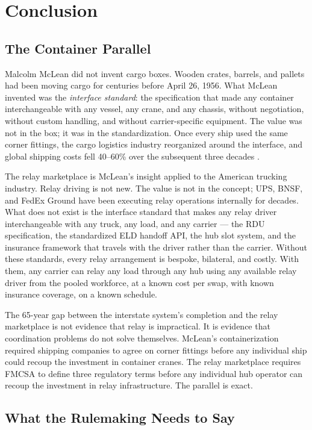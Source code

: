 \section{Conclusion}
\label{sec:conclusion}

\subsection{The Container Parallel}

Malcolm McLean did not invent cargo boxes. Wooden crates, barrels, and pallets had been moving
cargo for centuries before April 26, 1956. What McLean invented was the \textit{interface
standard}: the specification that made any container interchangeable with any vessel, any crane,
and any chassis, without negotiation, without custom handling, and without carrier-specific
equipment. The value was not in the box; it was in the standardization. Once every ship used
the same corner fittings, the cargo logistics industry reorganized around the interface, and
global shipping costs fell 40--60\% over the subsequent three decades \citep{Levinson2006}.

The relay marketplace is McLean's insight applied to the American trucking industry. Relay
driving is not new. The value is not in the concept; UPS, BNSF, and FedEx Ground have been
executing relay operations internally for decades. What does not exist is the interface standard
that makes any relay driver interchangeable with any truck, any load, and any carrier --- the
RDU specification, the standardized ELD handoff API, the hub slot system, and the insurance
framework that travels with the driver rather than the carrier. Without these standards,
every relay arrangement is bespoke, bilateral, and costly. With them, any carrier can relay
any load through any hub using any available relay driver from the pooled workforce, at a
known cost per swap, with known insurance coverage, on a known schedule.

The 65-year gap between the interstate system's completion and the relay marketplace is not
evidence that relay is impractical. It is evidence that coordination problems do not solve
themselves. McLean's containerization required shipping companies to agree on corner fittings
before any individual ship could recoup the investment in container cranes. The relay
marketplace requires FMCSA to define three regulatory terms before any individual hub operator
can recoup the investment in relay infrastructure. The parallel is exact.

\subsection{What the Rulemaking Needs to Say}

